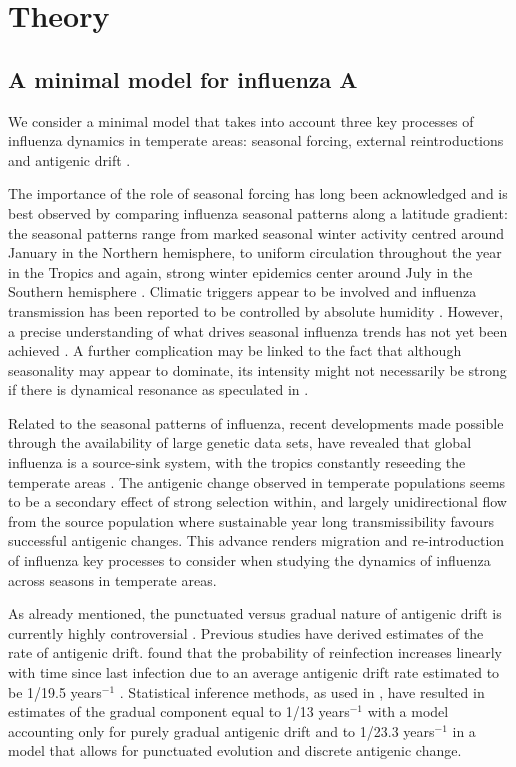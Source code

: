\section{Theory}
\label{sec:theory}

\subsection{A minimal model for influenza A}
\label{sec:model}


We consider a minimal model that takes into account three key
processes of influenza dynamics in temperate areas: seasonal forcing,
external reintroductions and antigenic drift \citep{Nelson2007}.

The importance of the role of seasonal forcing has long been
acknowledged and is best observed by comparing influenza seasonal
patterns along a latitude gradient: the seasonal patterns range from
marked seasonal winter activity centred around January in the Northern
hemisphere, to uniform circulation throughout the year in the Tropics
and again, strong winter epidemics center around July in the Southern
hemisphere \citep{Viboud2006}. Climatic triggers appear to be involved
\citep{Alonso2007a} and influenza transmission has been reported to be
controlled by absolute humidity \citep{Shaman2009}.  However, a
precise understanding of what drives seasonal influenza trends has not
yet been achieved \citep{Lipsitch2009}. A further complication may be
linked to the fact that although seasonality may appear to dominate,
its intensity might not necessarily be strong if there is dynamical
resonance as speculated in \citet{Dushoff2004}.

Related to the seasonal patterns of influenza, recent developments
made possible through the availability of large genetic data sets,
have revealed that global influenza is a source-sink system, with the
tropics constantly reseeding the temperate areas \citep{Rambaut2008,
  Russell2008}. The antigenic change observed in temperate populations
seems to be a secondary effect of strong selection within, and largely
unidirectional flow from the source population where sustainable year
long transmissibility favours successful antigenic changes. This
advance renders migration and re-introduction of influenza key
processes to consider when studying the dynamics of influenza across
seasons in temperate areas.

As already mentioned, the punctuated versus gradual nature of
antigenic drift is currently highly controversial
\citep{Ballesteros2009}. Previous studies have derived estimates of
the rate of antigenic drift. \citet{Potter1977} found that the
probability of reinfection increases linearly with time since last
infection due to an average antigenic drift rate estimated to be
1/19.5 years$^{-1}$ \citep{Pease1987}.  Statistical inference methods,
as used in \citet{Finkenstaedt2005}, have resulted in estimates of the
gradual component equal to 1/13 years$^{-1}$ with a model accounting
only for purely gradual antigenic drift and to 1/23.3 years$^{-1}$ in
a model that allows for punctuated evolution and discrete antigenic
change.

